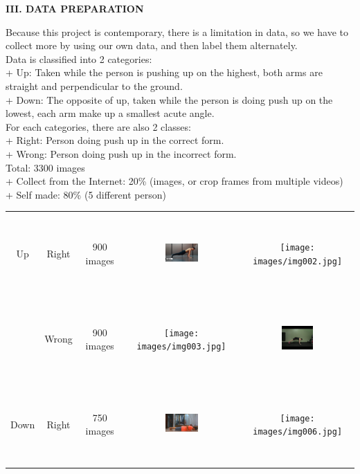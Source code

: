 \documentclass[12pt,a4paper,twoside]{article}
\begin{document}
	\begin{flushleft}
		\textbf{III. DATA PREPARATION}
			\begin{flushleft}
		Because this project is contemporary, there is a limitation in data, so we have to collect more by using our own data, and then label them alternately.\\
		\smallskip
		Data is classified into 2 categories:\\
		+ Up: Taken while the person is pushing up on the highest, both arms are straight and perpendicular to the ground.\\
		+ Down: The opposite of up, taken while the person is doing push up on the lowest, each arm make up a smallest acute angle.\\
		\smallskip
		For each categories, there are also 2 classes:\\
		+ Right: Person doing push up in the correct form.\\
		+ Wrong: Person doing push up in the incorrect form.\\
		\smallskip
		Total: 3300 images\\
		+ Collect from the Internet: 20\% (images, or crop frames from multiple videos)\\
		+ Self made: 80\% (5 different person)\\
		\begin{center}
			\begin{tabular}{ |c|c|c|c|c| } 
 				\hline
 				Up & Right & 900 images & \includegraphics[width=0.3\textwidth, height=30mm]{images/img001.png} & \texttt{[image: images/img002.jpg]}\\ 
 				& Wrong & 900 images & \texttt{[image: images/img003.jpg]} & \includegraphics[width=0.3\textwidth, height=30mm]{images/img004.png}\\ 
 				\hline
 				Down & Right & 750 images & \includegraphics[width=0.3\textwidth, height=30mm]{images/img005.png} & \texttt{[image: images/img006.jpg]}\\ 

\end{tabular}
\end{center}
\end{flushleft}
\end{flushleft}
\end{document}
